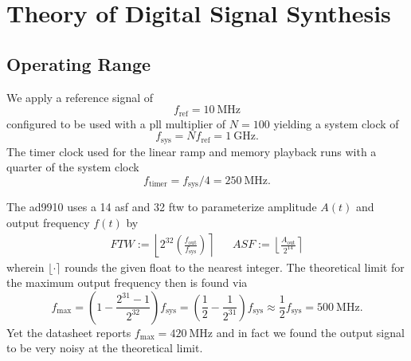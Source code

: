 \chapter{Theory of Digital Signal Synthesis}

\section{Operating Range}

We apply a reference signal of
\begin{equation}
  f_\text{ref}=\SI{10}{\mega\hertz}
\end{equation}
configured to be used with a \gls{pll} multiplier of
$N=100$ yielding a system clock of
\begin{equation}
  f_\text{sys}=Nf_\text{ref}=\SI{1}{\giga\hertz}.
\end{equation}
The timer clock used for the linear ramp and memory playback runs with
a quarter of the system clock
\begin{equation}
  f_\text{timer}=f_\text{sys}/4=\SI{250}{\mega\hertz}.
\end{equation}

The \gls{ad9910} uses a \SI{14}{\bit} \gls{asf} and \SI{32}{\bit} \gls{ftw}
to parameterize amplitude $A(t)$ and output frequency $f(t)$ by
\begin{align}
  FTW
  :=
  \left\lfloor2^{32}\left(\frac{f_\text{out}}{f_\text{sys}}\right)\right\rceil
  &&
  ASF
  :=
  \left\lfloor\frac{A_\text{out}}{2^{14}}\right\rceil
  \label{eq:elec:ftwasf}
\end{align}
wherein $\lfloor{\cdot}\rceil$ rounds the given float to the nearest integer.
The theoretical limit for the maximum output frequency then is found via
\begin{equation*}
  f_\text{max}
  =
  \left(1-\frac{2^{31}-1}{2^{32}}\right)f_\text{sys}
  =
  \left(\frac{1}{2}-\frac{1}{2^{31}}\right)f_\text{sys}
  \approx
  \frac{1}{2}f_\text{sys}
  =
  \SI{500}{\mega\hertz}.
\end{equation*}
Yet the datasheet \cite{AD9910} reports $f_\text{max}=\SI{420}{\mega\hertz}$
and in fact we found the output signal to be very noisy at the theoretical
limit.

